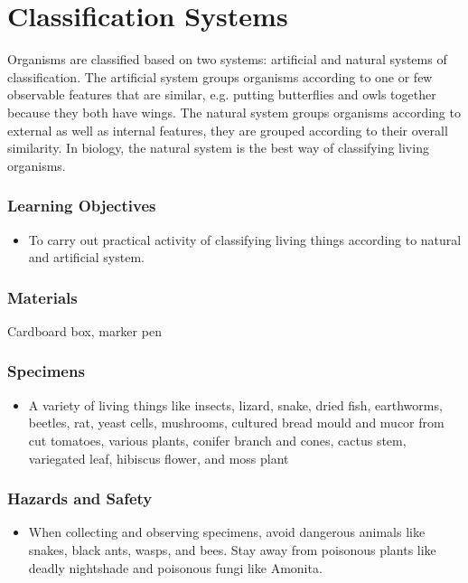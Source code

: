 \section{Classification Systems}
Organisms are classified based on two systems: artificial and natural systems of classification. The artificial system groups organisms according to one or few observable features that are similar, e.g. putting butterflies and owls together because they both have wings. The natural system groups organisms according to external as well as internal features, they are grouped according to their overall similarity. In biology, the natural system is the best way of classifying living organisms.

\subsubsection*{Learning Objectives}
\begin{itemize}
\item{To carry out practical activity of classifying living things according to natural and artificial system.}
\end{itemize}
\subsubsection*{Materials}
Cardboard box, marker pen

\subsubsection*{Specimens}
\begin{itemize}
\item{A variety of living things like insects, lizard, snake, dried fish, earthworms, beetles, rat,  yeast cells, mushrooms, cultured bread mould and mucor from cut tomatoes, various plants, conifer branch and cones, cactus stem, variegated leaf, hibiscus flower, and moss plant}
\end{itemize}

\subsubsection*{Hazards and Safety}
\begin{itemize}
\item{When collecting and observing specimens, avoid dangerous animals like snakes, black ants, wasps, and bees. Stay away from poisonous plants like deadly nightshade and poisonous fungi like Amonita.}
\end{itemize}

